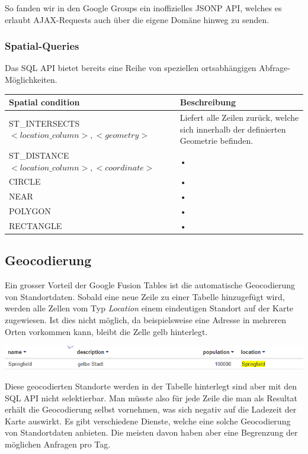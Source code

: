 So fanden wir in den Google Groups ein inoffizielles JSONP API, welches es erlaubt AJAX-Requests auch über die eigene Domäne hinweg zu senden.

\subsubsection{Spatial-Queries}
Das SQL API bietet bereits eine Reihe von speziellen ortsabhängigen Abfrage-Möglichkeiten.
\begin{tabular}{|l|l|}
\hline 
Spatial condition & Beschreibung \\ 
\hline 
ST\_INTERSECTS\(<location\_column>, <geometry>\) & Liefert alle Zeilen zurück, welche sich innerhalb der definierten Geometrie befinden. \\ 
\hline 
ST\_DISTANCE\(<location\_column>, <coordinate>\) & • \\ 
\hline 
CIRCLE & • \\ 
\hline 
NEAR & • \\ 
\hline 
POLYGON & • \\ 
\hline 
RECTANGLE & • \\ 
\hline 
\end{tabular} 

\subsection{Geocodierung}
Ein grosser Vorteil der Google Fusion Tables ist die automatische 
\gls{Geocodierung} von Standortdaten. Sobald eine neue Zeile zu einer Tabelle hinzugefügt wird, werden alle Zellen vom Typ \emph{Location} einem eindeutigen Standort auf der Karte zugewiesen. Ist dies nicht möglich, da beispielsweise eine Adresse in mehreren Orten vorkommen kann, bleibt die Zelle gelb hinterlegt.
 
\includegraphics[scale=0.75]{images/geocoding_failed.png}

Diese geocodierten Standorte werden in der Tabelle hinterlegt sind aber mit den SQL API nicht selektierbar. Man müsste also für jede Zeile die man als Resultat erhält die Geocodierung selbst vornehmen, was sich negativ auf die Ladezeit der Karte auswirkt.
Es gibt verschiedene Dienste, welche eine solche Geocodierung von Standortdaten anbieten. Die meisten davon haben aber eine Begrenzung der möglichen Anfragen pro Tag.

